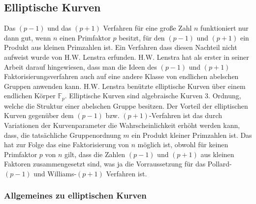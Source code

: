 \documentclass[10pt, bigheadings]{scrartcl}
\begin{document}
\subsection{Elliptische Kurven}

Das $(p-1)$ und das $(p+1)$ Verfahren für eine große Zahl $n$ funktioniert
nur dann gut, wenn $n$ einen Primfaktor $p$ besitzt, für den $(p-1)$ und $(p+1)$
ein Produkt aus kleinen Primzahlen ist. Ein Verfahren dass diesen Nachteil nicht
aufweist wurde von H.W. Lenstra erfunden. H.W. Lenstra hat als erster in seiner
Arbeit darauf hingewiesen, dass man die Ideen des $(p-1)$ und $(p+1)$ 
Faktorisierungsverfahren auch auf eine andere Klasse von endlichen abelschen
Gruppen anwenden kann. H.W. Lenstra benützte elliptische Kurven über einem
endlichen Körper ${\mathbb F}_p$. Elliptische Kurven sind algebraische Kurven
$3$. Ordnung, welche die Struktur einer abelschen Gruppe besitzen. Der Vorteil
der elliptischen Kurven gegenüber dem $(p-1)$ bzw. $(p+1)$-Verfahren ist das
durch Variationen der Kurvenparameter die Wahrscheinlichkeit erhöht werden kann,
 dass, die tatsächliche Gruppenordnung $m$ ein Produkt kleiner Primzahlen ist. 
Das hat zur Folge das eine Faktorisierung von $n$ möglich ist, obwohl für 
keinen Primfaktor $p$ von $n$ gilt, dass die Zahlen $(p-1)$ und $(p+1)$ aus 
kleinen Faktoren zusammengesetzt sind, was ja die Vorraussetzung für das 
Pollard-$(p-1)$ und Williams-$(p+1)$ Verfahren ist.

\subsubsection*{Allgemeines zu elliptischen Kurven}
\end{document}
